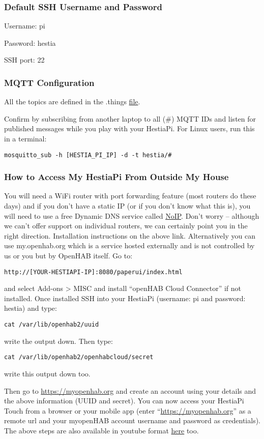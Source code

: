 \subsubsection{Default SSH Username and Password}

Username: pi

Password: hestia

SSH port: 22

\subsubsection{MQTT Configuration}
All the topics are defined in the .things
\href{https://github.com/HestiaPi/hestia-touch-openhab/wiki/File-Structure-&-Paths-ONE}{file}.

Confirm by subscribing from another laptop to all (\#) MQTT IDs and listen for
published messages while you play with your HestiaPi. For Linux users, run this
in a terminal:

\texttt{mosquitto\_sub -h [HESTIA\_PI\_IP] -d -t hestia/\#}

\subsubsection{How to Access My HestiaPi From Outside My House}

You will need a WiFi router with port forwarding feature (most routers do these
days) and if you don’t have a static IP (or if you don’t know what this is),
you will need to use a free Dynamic DNS service called
\href{https://www.noip.com/support/knowledgebase/install-ip-duc-onto-raspberry-pi/}{NoIP}.
Don’t worry -- although we can’t offer support on individual routers, we can
certainly point you in the right direction. Installation instructions on the
above link.  Alternatively you can use my.openhab.org which is a service hosted
externally and is not controlled by us or you but by OpenHAB itself. Go to:

\texttt{http://[YOUR-HESTIAPI-IP]:8080/paperui/index.html}

and select Add-ons > MISC and install ``openHAB Cloud Connector'' if not
installed. Once installed SSH into your HestiaPi (username: pi and password:
hestia) and type:

\texttt{cat /var/lib/openhab2/uuid}

write the output down. Then type:

\texttt{cat /var/lib/openhab2/openhabcloud/secret}

write this output down too.

Then go to \url{https://myopenhab.org} and create an account using your details
and the above information (UUID and secret). You can now access your HestiaPi
Touch from a browser or your mobile app (enter ``\url{https://myopenhab.org}''
as a remote url and your myopenHAB account username and password as
credentials).  The above steps are also available in youtube format
\href{https://www.youtube.com/watch?v=joz5f4ejJVc}{here} too.
